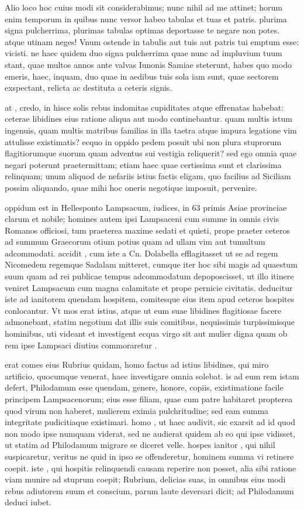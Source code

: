  Alio loco hoc cuius modi sit considerabimus; nunc nihil ad me attinet; horum enim temporum in quibus nunc versor habeo tabulas et tuas et patris. plurima signa pulcherrima, plurimas tabulas optimas deportasse te negare non potes. atque utinam neges! Vnum ostende in tabulis aut tuis aut patris tui emptum esse: vicisti. ne haec quidem duo signa pulcherrima quae nunc ad impluvium tuum stant, quae multos annos ante valvas Iunonis Samiae steterunt, habes quo modo emeris, haec, inquam, duo quae in aedibus tuis sola iam sunt, quae sectorem exspectant, relicta ac destituta a ceteris signis.

 at , credo, in hisce solis rebus indomitas cupiditates atque effrenatas habebat: ceterae libidines eius ratione aliqua aut modo continebantur. quam multis istum ingenuis, quam multis matribus familias in illa taetra atque impura legatione vim attulisse existimatis? ecquo in oppido pedem posuit ubi non plura stuprorum flagitiorumque suorum quam adventus sui vestigia reliquerit? sed ego omnia quae negari poterunt praetermittam; etiam haec quae certissima sunt et clarissima relinquam; unum aliquod de nefariis istius factis eligam, quo facilius ad Siciliam possim aliquando, quae mihi hoc oneris negotique imposuit, pervenire.

 oppidum est in Hellesponto Lampsacum, iudices, in 63 primis Asiae provinciae clarum et nobile; homines autem ipsi Lampsaceni cum summe in omnis civis Romanos officiosi, tum praeterea maxime sedati et quieti, prope praeter ceteros ad summum Graecorum otium potius quam ad ullam vim aut tumultum adcommodati. accidit , cum iste a Cn. Dolabella efflagitasset ut se ad regem Nicomedem regemque Sadalam mitteret, cumque iter hoc sibi magis ad quaestum suum quam ad rei publicae tempus adcommodatum depoposcisset, ut illo itinere veniret Lampsacum cum magna calamitate et prope pernicie civitatis. deducitur iste ad ianitorem quendam hospitem, comitesque eius item apud ceteros hospites conlocantur. Vt mos erat istius, atque ut eum suae libidines flagitiosae facere admonebant, statim negotium dat illis suis comitibus, nequissimis turpissimisque hominibus, uti videant et investigent ecqua virgo sit aut mulier digna quam ob rem ipse Lampsaci diutius commoraretur .

 erat comes eius Rubrius quidam, homo factus ad istius libidines, qui miro artificio, quocumque venerat, haec investigare omnia solebat. is ad eum rem istam defert, Philodamum esse quendam, genere, honore, copiis, existimatione facile principem Lampsacenorum; eius esse filiam, quae cum patre habitaret propterea quod virum non haberet, mulierem eximia pulchritudine; sed eam summa integritate pudicitiaque existimari. homo , ut haec audivit, sic exarsit ad id quod non modo ipse numquam viderat, sed ne audierat quidem ab eo qui ipse vidisset, ut statim ad Philodamum migrare se diceret velle. hospes ianitor , qui nihil suspicaretur, veritus ne quid in ipso se offenderetur, hominem summa vi retinere coepit. iste , qui hospitis relinquendi causam reperire non posset, alia sibi ratione viam munire ad stuprum coepit; Rubrium, delicias suas, in omnibus eius modi rebus adiutorem suum et conscium, parum laute deversari dicit; ad Philodamum deduci iubet.


